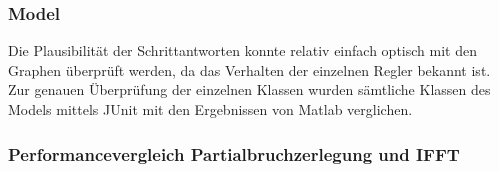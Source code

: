 \subsubsection{Model}
Die Plausibilität der Schrittantworten konnte relativ einfach optisch mit den Graphen überprüft werden, da das Verhalten der einzelnen Regler bekannt ist. Zur genauen Überprüfung der einzelnen Klassen wurden sämtliche Klassen des Models mittels JUnit mit den Ergebnissen von Matlab verglichen.

\subsubsection{Performancevergleich Partialbruchzerlegung und IFFT}\label{residuenvsifft}
%